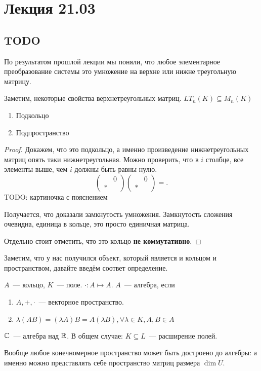 \section{Лекция 21.03}
\subsection{TODO}
\begin{remark}
    По результатом прошлой лекции мы поняли,
    что любое элементарное преобразование системы
    это умножение на верхне или нижне треугольную матрицу.
\end{remark}
\begin{remark}
    Заметим, некоторые свойства верхнетреугольных матриц. $LT_n(K)\subseteq M_n(K)$ 
    \begin{enumerate}
        \item Подкольцо
        \item Подпространство
    \end{enumerate}
\end{remark}
\begin{proof}
    Докажем, что это подкольцо, а именно произведение нижнетреугольных матриц опять таки
    нижнетреугольная. Можно проверить, что в $i$ столбце, все элементы выше, чем $i$ 
    должны быть равны нулю.
    \[
    \begin{pmatrix}
        & 0\\
        *&
    \end{pmatrix}
    \begin{pmatrix}
        & 0\\
        *&
    \end{pmatrix}=
    .\] 
     TODO: картиночка с пояснением

     Получается, что доказали замкнутость умножения. Замкнутость сложения очевидна,
     единица в кольце, это просто единичная матрица. 
     
     Отдельно стоит отметить, что это кольцо \textbf{не коммутативно}.
\end{proof} 
\begin{motivation}
    Заметим, что у нас получился объект, который является и кольцом и пространством, давайте
    введём соответ определение.
\end{motivation}
\begin{definition}
    $A$~--- кольцо, $K$~--- поле.
    $\cdot: A\mapsto A$. $A$~--- алгебра, если 
     \begin{enumerate}
         \item $A,+,\cdot$~--- векторное пространство.
         \item $\lambda(AB) = (\lambda A)B = A(\lambda B), \forall \lambda\in K, A,B\in A$
    \end{enumerate}
\end{definition}
\begin{example}
    $\mathbb{C}$~--- алгебра над $\mathbb{R}$. В общем случае: $K\subseteq L$~--- расширение полей.
\end{example}
\begin{statement}
     Вообще любое конечномерное пространство может быть достроено до алгебры:
     а именно можно представлять себе пространство матриц размера $\dim U$.
\end{statement}

